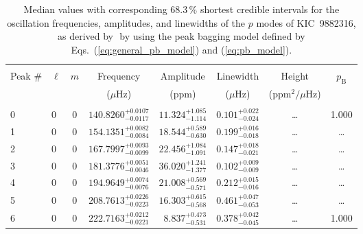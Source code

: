 \begin{table*}[!]
\caption{Median values with corresponding 68.3\,\% shortest credible intervals for the oscillation frequencies, amplitudes, and linewidths of the $p$ modes of KIC~9882316, as derived by \diamonds\,\,by using the peak bagging model defined by Eqs.~(\ref{eq:general_pb_model}) and (\ref{eq:pb_model}).}
\label{tab:9882316p}
\centering
\begin{tabular}{llcrrlrc}
\hline\hline
\\[-8pt]
Peak \# & $\ell$ & $m$ & \multicolumn{1}{c}{Frequency} & \multicolumn{1}{c}{Amplitude} & \multicolumn{1}{c}{Linewidth} & \multicolumn{1}{c}{Height}& $p_\mathrm{B}$\\
 & & & \multicolumn{1}{c}{($\mu$Hz)} & \multicolumn{1}{c}{(ppm)} & \multicolumn{1}{c}{($\mu$Hz)} & \multicolumn{1}{c}{(ppm$^2/\mu$Hz)}\\
\hline \\[-8pt]
0 & 0 & 0 & $    140.8260_{-      0.0117}^{+      0.0107}$ & $      11.324_{-       1.114}^{+       1.085}$ & $       0.101_{-       0.024}^{+       0.022}$ & \multicolumn{1}{c}{\dots} & 1.000 \\[1pt] 
1 & 0 & 0 & $    154.1351_{-      0.0084}^{+      0.0082}$ & $      18.544_{-       0.630}^{+       0.589}$ & $       0.199_{-       0.018}^{+       0.016}$ & \multicolumn{1}{c}{\dots} & \dots \\[1pt]
2 & 0 & 0 & $    167.7997_{-      0.0099}^{+      0.0093}$ & $      22.456_{-       1.091}^{+       1.084}$ & $       0.147_{-       0.021}^{+       0.018}$ & \multicolumn{1}{c}{\dots} & \dots \\[1pt]
3 & 0 & 0 & $    181.3776_{-      0.0046}^{+      0.0051}$ & $      36.020_{-       1.377}^{+       1.241}$ & $       0.102_{-       0.009}^{+       0.009}$ & \multicolumn{1}{c}{\dots} & \dots \\[1pt]
4 & 0 & 0 & $    194.9649_{-      0.0076}^{+      0.0074}$ & $      21.008_{-       0.571}^{+       0.569}$ & $       0.212_{-       0.016}^{+       0.015}$ & \multicolumn{1}{c}{\dots} & \dots \\[1pt]
5 & 0 & 0 & $    208.7613_{-      0.0223}^{+      0.0226}$ & $      16.303_{-       0.568}^{+       0.615}$ & $       0.461_{-       0.053}^{+       0.047}$ & \multicolumn{1}{c}{\dots} & \dots \\[1pt]
6 & 0 & 0 & $    222.7163_{-      0.0221}^{+      0.0212}$ & $       8.837_{-       0.531}^{+       0.473}$ & $       0.378_{-       0.045}^{+       0.042}$ & \multicolumn{1}{c}{\dots} & 1.000\\[1pt]

\end{tabular}
\end{table*}
